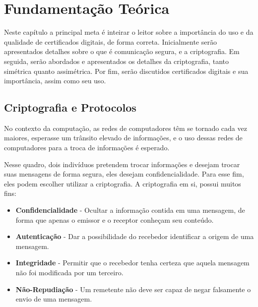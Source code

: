 


\chapter[Fundamentação Teórica]{Fundamentação Teórica}

	Neste capítulo a principal meta é inteirar o leitor sobre a importância do uso e da qualidade de certificados digitais, de forma correta. Inicialmente serão apresentados detalhes sobre o que é comunicação segura, e a criptografia. Em seguida, serão abordados e apresentados os detalhes da criptografia, tanto simétrica quanto assimétrica. Por fim, serão discutidos certificados digitais e sua importância, assim como seu uso.

\section[Criptografia e Protocolos]{Criptografia e Protocolos}
	No contexto da computação, as redes de computadores têm se tornado cada vez maiores, esperasse um trânsito elevado de informações, e o uso dessas redes de computadores para a troca de informações é esperado. 
	
	Nesse quadro, dois indivíduos pretendem trocar informações e desejam trocar suas mensagens de forma segura, eles desejam confidencialidade. Para esse fim, eles podem escolher utilizar a criptografia. A criptografia em si, possui muitos fins:

	\begin{itemize}
		\item \textbf{Confidencialidade} - Ocultar a informação contida em uma mensagem, de forma que apenas o emissor e o receptor conheçam seu conteúdo.
		\item \textbf{Autenticação} - Dar a possibilidade do recebedor identificar a origem de uma mensagem.
		\item \textbf{Integridade} - Permitir que o recebedor tenha certeza que aquela mensagem não foi modificada por um terceiro.
		\item \textbf{Não-Repudiação} - Um remetente não deve ser capaz de negar falsamente o envio de uma mensagem.
	\end{itemize}

